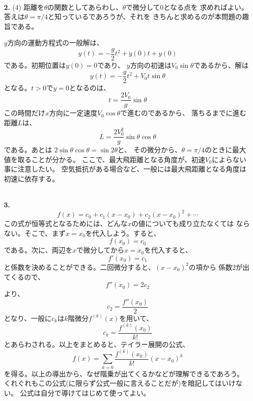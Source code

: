 \documentclass{jarticle}
\newcommand{\ans}[2]{\noindent\\ {\bf \large #1.} (#2)}
\newcommand{\Ans}[1]{\noindent\\ {\bf \large #1.} }
\begin{document}
\ans{2}{4}
距離を$\theta$の関数としてあらわし、$\theta$で微分して$0$となる点を
求めればよい。答えは$\theta = \pi/4$と知っているであろうが、それを
きちんと求めるのが本問題の趣旨である。

$y$方向の運動方程式の一般解は、
\begin{equation}
  y(t) = - \frac{g}{2} t^2 + \dot{y}(0)t + y(0)
\end{equation}
である。初期位置は$y(0)=0$であり、
$y$方向の初速は$V_0 \sin \theta$であるから、解は
\begin{equation}
  y(t) = - \frac{g}{2} t^2 + V_0 t \sin \theta
\end{equation}
となる。$t>0$で$y=0$となるのは、
\begin{equation}
  t = \frac{2 V_0}{g} \sin \theta
\end{equation}
この時間だけ$x$方向に一定速度$V_0 \cos \theta$で進むのであるから、
落ちるまでに進む距離$L$は、
\begin{equation}
  L = \frac{2 V_0^2}{g} \sin \theta \cos \theta
\end{equation}
である。あとは $2 \sin \theta \cos \theta = \sin 2\theta $と、
その微分から、$\theta = \pi/4$のときに最大値を取ることが分かる。
ここで、最大飛距離となる角度が、初速$V_0$によらない事に注意したい。
空気抵抗がある場合など、一般には最大飛距離となる角度は初速に依存する。

\noindent
\Ans{3}
\begin{equation}
  f(x) = c_0 + c_1 (x-x_0) + c_2 (x-x_0)^2 + \cdots
\end{equation}
この式が恒等式となるためには、どんな$x$の値についても成り立たなくては
ならない。そこで、まず$x=x_0$を代入しよう。すると、
\begin{equation}
  f(x_0) = c_0
\end{equation}
である。次に、両辺を$x$で微分してから$x=x_0$を代入すると、
\begin{equation}
  f'(x_0) = c_1
\end{equation}
と係数を決めることができる。二回微分すると、$(x-x_0)^2$の項から
係数$2$が出てくるので、
\begin{equation}
  f''(x_0) = 2 c_2
\end{equation}
より、
\begin{equation}
  c_2 = \frac{f''(x_0)}{2}
\end{equation}
となり、一般に$c_k$は$k$階微分$f^{(k)}(x)$を用いて、
\begin{equation}
  c_k = \frac{f^{(k)}(x_0)}{k!}
\end{equation}
とあらわされる。以上をまとめると、テイラー展開の公式、
\begin{equation}
  f(x) = \sum_{k=0} \frac{f^{(k)}(x_0)}{k!} (x-x_0)^k
\end{equation}
を得る。以上の導出から、なぜ階乗が出てくるかなどが理解できるであろう。
くれぐれもこの公式(に限らず公式一般に言えることだが)を暗記してはいけない。
公式は自分で導けてはじめて使ってよい。
\end{document}
